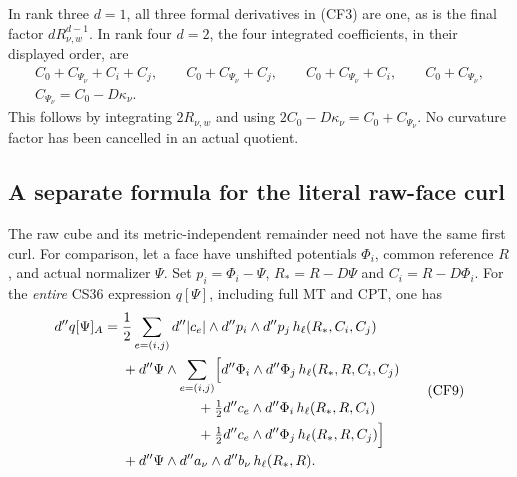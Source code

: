 In rank three $d=1$, all three formal derivatives in (CF3)
are one, as is the final factor $dR_{\nu,w}^{d-1}$.  In rank
four $d=2$, the four integrated coefficients, in their displayed
order, are
\[
 \begin{gathered}
 C_0+C_{\Psi_\nu}+C_i+C_j,\qquad
 C_0+C_{\Psi_\nu}+C_j,\qquad
 C_0+C_{\Psi_\nu}+C_i,\qquad C_0+C_{\Psi_\nu},\\
             C_{\Psi_\nu}=C_0-D\kappa_\nu.
 \end{gathered}
 \tag{CF8}
\]
This follows by integrating $2R_{\nu,w}$ and using
$2C_0-D\kappa_\nu=C_0+C_{\Psi_\nu}$.  No curvature factor
has been cancelled in an actual quotient.

\subsection{A separate formula for the literal raw-face curl}

The raw cube and its metric-independent remainder need not have
the same first curl.  For comparison, let a face have unshifted
potentials $\Phi_i$, common reference $R$, and actual normalizer
$\Psi$.  Set $p_i=\Phi_i-\Psi$, $R_*=R-D\Psi$ and
$C_i=R-D\Phi_i$.  For the \emph{entire} CS36 expression
$q[\Psi]$, including full MT and CPT, one has
\[
\begin{split}
 d''q[\Psi]_A
 ={}&\frac12\sum_{e=(i,j)}d''|c_e|\wedge d''p_i\wedge d''p_j\,
                                      h_\ell(R_*,C_i,C_j)\\
 &+d''\Psi\wedge\sum_{e=(i,j)}\Bigl[
      d''\Phi_i\wedge d''\Phi_j\,
                                      h_\ell(R_*,R,C_i,C_j)\\
 &\hspace{19mm}+\tfrac12 d''c_e\wedge d''\Phi_i\,
                                      h_\ell(R_*,R,C_i)\\
 &\hspace{19mm}+\tfrac12 d''c_e\wedge d''\Phi_j\,
                                      h_\ell(R_*,R,C_j)\Bigr]\\
 &+d''\Psi\wedge d''a_\nu\wedge d''b_\nu\,
                                      h_\ell(R_*,R).
\end{split}
 \tag{CF9}
\]

